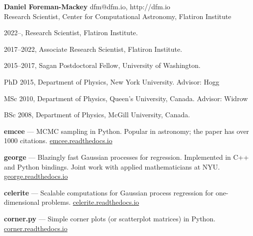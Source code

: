 \documentclass[12pt,letterpaper]{article}
\begin{document}
\thispagestyle{empty}\sloppy\sloppypar\raggedbottom

\textbf{\Large Daniel Foreman-Mackey} \hfill
\textsf{\small dfm@dfm.io, http://dfm.io} \\[0.5ex]
Research Scientist, Center for Computational Astronomy, Flatiron Institute\\[0.5ex]

\begin{list}{}{\cvlist}
\item
2022--, Research Scientist, Flatiron Institute.
\item
2017--2022, Associate Research Scientist, Flatiron Institute.
\item
2015--2017, Sagan Postdoctoral Fellow, University of Washington.
\item
PhD 2015, Department of Physics, New York University. Advisor: Hogg
\item
MSc 2010, Department of Physics, Queen's University, Canada. Advisor: Widrow
\item
BSc 2008, Department of Physics, McGill University, Canada.
\end{list}

\begin{list}{}{\cvlist}

\end{list}

\begin{list}{}{\cvlist}

\item {\bf emcee} ---
    MCMC sampling in Python. Popular in astronomy;
    the paper has over 1000 citations.
    \url{emcee.readthedocs.io}

\item {\bf george} ---
    Blazingly fast Gaussian processes for regression. Implemented in C++ and
    Python bindings. Joint work with applied mathematicians at NYU.
    \url{george.readthedocs.io}

\item {\bf celerite} ---
    Scalable computations for Gaussian process regression for one-dimensional
    problems.
    \url{celerite.readthedocs.io}

\item {\bf corner.py} ---
    Simple corner plots (or scatterplot matrices) in Python.
    \url{corner.readthedocs.io}

\end{list}

\end{document}

